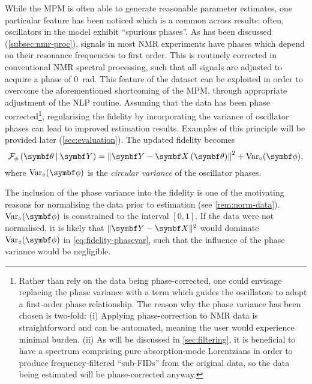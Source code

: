 While the \ac{MPM} is often able to generate reasonable parameter estimates,
one particular feature has been noticed which is a common across
results: often, oscillators in the model exhibit ``spurious
phases''. As has been discussed (\cref{subsec:nmr-proc}),
signals in most \ac{NMR} experiments have phases which depend on their
resonance frequencies to first order. This is routinely corrected in
conventional \ac{NMR} spectral processing, such that all signals are adjusted to
acquire a phase of \qty{0}{\radian}. This feature of the dataset can be
exploited in order to overcome the aforementioned shortcoming of the \ac{MPM},
through appropriate adjustment of the \ac{NLP} routine. Assuming that
the data has been phase corrected\footnote{
    Rather than rely on the data being phase-corrected, one could envisage
    replacing the phase variance with a term which guides the
    oscillators to adopt a first-order phase relationship. The reason why the
    phase variance has been chosen is two-fold: (i) Applying phase-correction
    to \ac{NMR} data is straightforward and can be automated,
    meaning the user would experience minimal burden. (ii) As will be discussed
    in \cref{sec:filtering}, it is beneficial to have a spectrum comprising
    pure absorption-mode Lorentzians in order to produce frequency-filtered
    ``sub-\acp{FID}'' from the original data, so the data being estimated will
    be phase-corrected anyway.
}, regularising the fidelity by incorporating the variance of oscillator
phases can lead to improved estimation results. Examples of
this principle will be provided later (\cref{sec:evaluation}).
The updated fidelity becomes
\begin{equation}
    \FphithY = \left \lVert \bY - \bXth \right \rVert^2 + \circvar,
    \label{eq:fidelity-phasevar}
\end{equation}
where $\circvar$ is the \emph{circular variance} of the oscillator phases.
\begin{remark}
    The inclusion of the phase variance into the fidelity is one of the
    motivating reasons for normalising the data prior to estimation (see
    \cref{rem:norm-data}). $\circvar$ is constrained to the interval $[0, 1]$.
    If the data were not normalised, it is likely that $\lVert \bY - \bX
    \rVert^2$ would dominate $\circvar$ in \cref{eq:fidelity-phasevar},
    such that the influence of the phase variance would be negligible.
\end{remark}

